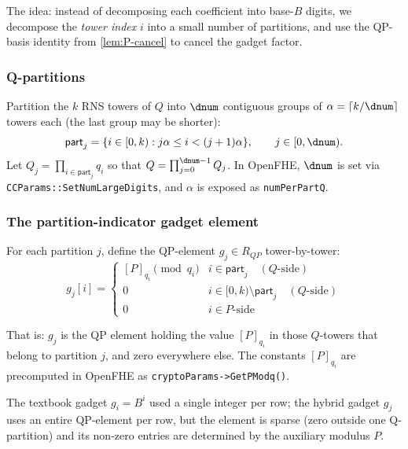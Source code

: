 The idea: instead of decomposing each coefficient into base-$B$ digits, we decompose the \emph{tower index} $i$ into a small number of partitions, and use the QP-basis identity from \autoref{lem:P-cancel} to cancel the gadget factor.

\subsubsection{Q-partitions}

Partition the $k$ RNS towers of $Q$ into $\dnum$ contiguous groups of $\alpha = \lceil k / \dnum \rceil$ towers each (the last group may be shorter):
\begin{equation}
    \label{eq:partitions}
    \mathsf{part}_j = \{ i \in [0, k) : j \alpha \leq i < (j+1)\alpha \}, \qquad j \in [0, \dnum).
\end{equation}
Let $Q_j = \prod_{i \in \mathsf{part}_j} q_i$ so that $Q = \prod_{j=0}^{\dnum - 1} Q_j$. In OpenFHE, $\dnum$ is set via \texttt{CCParams::SetNumLargeDigits}, and $\alpha$ is exposed as \texttt{numPerPartQ}.

\subsubsection{The partition-indicator gadget element}

For each partition $j$, define the QP-element $g_j \in R_{QP}$ tower-by-tower:
\begin{equation}
    \label{eq:gj}
    g_j[i] =
    \begin{cases}
        [P]_{q_i} \pmod{q_i} & i \in \mathsf{part}_j \quad (Q\text{-side}) \\
        0                    & i \in [0, k) \setminus \mathsf{part}_j \quad (Q\text{-side}) \\
        0                    & i \in P\text{-side}
    \end{cases}
\end{equation}

That is: $g_j$ is the QP element holding the value $[P]_{q_i}$ in those $Q$-towers that belong to partition $j$, and zero everywhere else. The constants $[P]_{q_i}$ are precomputed in OpenFHE as \texttt{cryptoParams->GetPModq()}.

\begin{remark}
The textbook gadget $g_i = B^i$ used a single integer per row; the hybrid gadget $g_j$ uses an entire QP-element per row, but the element is sparse (zero outside one Q-partition) and its non-zero entries are determined by the auxiliary modulus $P$.
\end{remark}

